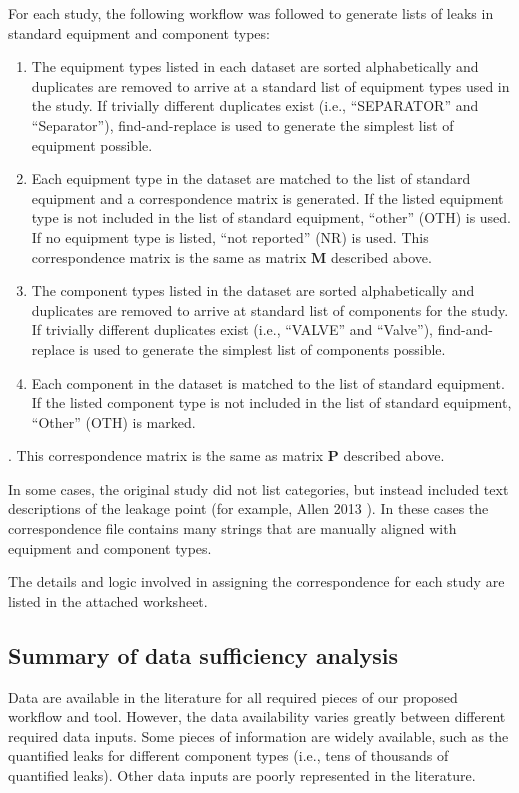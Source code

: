 \documentclass[11pt]{report}
\begin{document}
For each study, the following workflow was followed to generate lists of leaks in standard equipment and component types:
\begin{enumerate}
\item The equipment types listed in each dataset are sorted alphabetically and duplicates are removed to arrive at a standard list of equipment types used in the study. If trivially different duplicates exist (i.e., ``SEPARATOR'' and ``Separator''), find-and-replace is used to generate the simplest list of equipment possible.
\item Each equipment type in the dataset are matched to the list of standard equipment and a correspondence matrix is generated. If the listed equipment type is not included in the list of standard equipment, ``other'' (OTH) is used. If no equipment type is listed, ``not reported'' (NR) is used. This correspondence matrix is the same as matrix $\textbf{M}$ described above.
\item The component types listed in the dataset are sorted alphabetically and duplicates are removed to arrive at standard list of components for the study.  If trivially different duplicates exist (i.e., ``VALVE'' and ``Valve''), find-and-replace is used to generate the simplest list of components possible.
\item Each component in the dataset is matched to the list of standard equipment. If the listed component type is not included in the list of standard equipment, ``Other'' (OTH) is marked.\end{enumerate}. This correspondence matrix is the same as matrix $\textbf{P}$ described above.

In some cases, the original study did not list categories, but instead included text descriptions of the leakage point (for example, Allen 2013 \cite{Allen2013}). In these cases the correspondence file contains many strings that are manually aligned with equipment and component types.

The details and logic involved in assigning the correspondence for each study are listed in the attached worksheet.

\subsection{Summary of data sufficiency analysis}

Data are available in the literature for all required pieces of our proposed workflow and tool. However, the data availability varies greatly between different required data inputs. Some pieces of information are widely available, such as the quantified leaks for different component types (i.e., tens of thousands of quantified leaks). Other data inputs are poorly represented in the literature.
\end{document}
